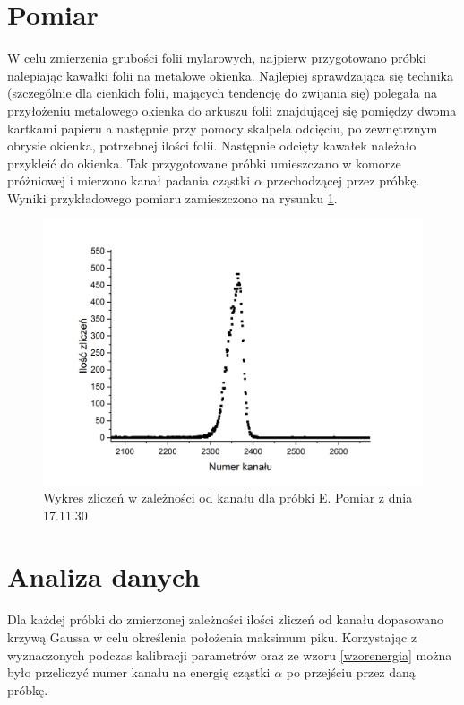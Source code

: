 \documentclass[12pt,a4paper]{article}
\begin{document}
\section{Pomiar}

W celu zmierzenia grubości folii mylarowych, najpierw przygotowano próbki nalepiając kawałki folii na metalowe okienka. Najlepiej sprawdzająca się technika (szczególnie dla cienkich folii, mających tendencję do zwijania się) polegała na przyłożeniu metalowego okienka do arkuszu folii znajdującej się pomiędzy dwoma kartkami papieru a następnie przy pomocy skalpela odcięciu, po zewnętrznym obrysie okienka, potrzebnej ilości folii. Następnie odcięty kawałek należało przykleić do okienka. Tak przygotowane próbki umieszczano w komorze próżniowej i mierzono kanał padania cząstki $\alpha$ przechodzącej przez próbkę. Wyniki przykładowego pomiaru zamieszczono na rysunku \ref{przykladowy_pomiar}.




\begin{figure}[H]
\centering
\includegraphics[scale=0.5]{Enlarged.png}
\caption{Wykres zliczeń w zależności od kanału dla próbki E. Pomiar z dnia 17.11.30}
\label{przykladowy_pomiar}
\end{figure}


\section{Analiza danych}
Dla każdej próbki do zmierzonej zależności ilości zliczeń od kanału dopasowano krzywą Gaussa w celu określenia położenia maksimum piku. Korzystając z wyznaczonych podczas kalibracji parametrów oraz ze wzoru \ref{wzorenergia} można było przeliczyć numer kanału na energię cząstki $\alpha$ po przejściu przez daną próbkę. 
\end{document}
